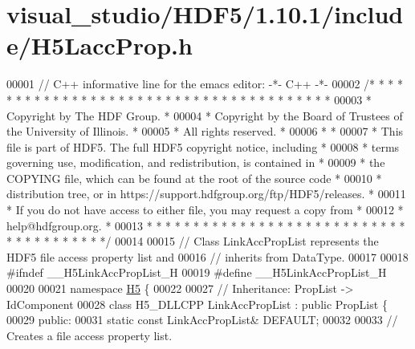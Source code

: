 \hypertarget{visual__studio_2_h_d_f5_21_810_81_2include_2_h5_lacc_prop_8h_source}{}\section{visual\+\_\+studio/\+H\+D\+F5/1.10.1/include/\+H5\+Lacc\+Prop.h}
\label{visual__studio_2_h_d_f5_21_810_81_2include_2_h5_lacc_prop_8h_source}

\begin{DoxyCode}
00001 \textcolor{comment}{// C++ informative line for the emacs editor: -*- C++ -*-}
00002 \textcolor{comment}{/* * * * * * * * * * * * * * * * * * * * * * * * * * * * * * * * * * * * * * *}
00003 \textcolor{comment}{ * Copyright by The HDF Group.                                               *}
00004 \textcolor{comment}{ * Copyright by the Board of Trustees of the University of Illinois.         *}
00005 \textcolor{comment}{ * All rights reserved.                                                      *}
00006 \textcolor{comment}{ *                                                                           *}
00007 \textcolor{comment}{ * This file is part of HDF5.  The full HDF5 copyright notice, including     *}
00008 \textcolor{comment}{ * terms governing use, modification, and redistribution, is contained in    *}
00009 \textcolor{comment}{ * the COPYING file, which can be found at the root of the source code       *}
00010 \textcolor{comment}{ * distribution tree, or in https://support.hdfgroup.org/ftp/HDF5/releases.  *}
00011 \textcolor{comment}{ * If you do not have access to either file, you may request a copy from     *}
00012 \textcolor{comment}{ * help@hdfgroup.org.                                                        *}
00013 \textcolor{comment}{ * * * * * * * * * * * * * * * * * * * * * * * * * * * * * * * * * * * * * * */}
00014 
00015 \textcolor{comment}{// Class LinkAccPropList represents the HDF5 file access property list and}
00016 \textcolor{comment}{// inherits from DataType.}
00017 
00018 \textcolor{preprocessor}{#ifndef \_\_H5LinkAccPropList\_H}
00019 \textcolor{preprocessor}{#define \_\_H5LinkAccPropList\_H}
00020 
00021 \textcolor{keyword}{namespace }\hyperlink{namespace_h5}{H5} \{
00022 
00027 \textcolor{comment}{//  Inheritance: PropList -> IdComponent}
00028 \textcolor{keyword}{class }H5\_DLLCPP LinkAccPropList : \textcolor{keyword}{public} PropList \{
00029    \textcolor{keyword}{public}:
00031         \textcolor{keyword}{static} \textcolor{keyword}{const} LinkAccPropList& DEFAULT;
00032 
00033         \textcolor{comment}{// Creates a file access property list.}

\end{DoxyCode}

